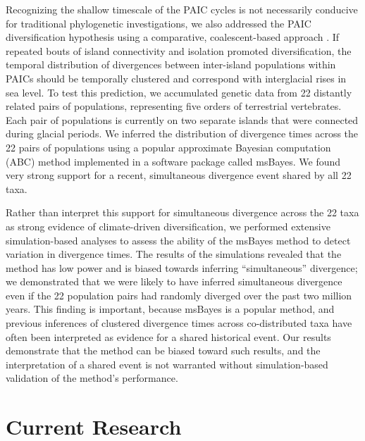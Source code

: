 \documentclass[10pt]{article}
\begin{document}
Recognizing the shallow timescale of the PAIC cycles is not necessarily
conducive for traditional phylogenetic investigations, we also addressed the
PAIC diversification hypothesis using a comparative, coalescent-based approach
.
If repeated bouts of island connectivity and isolation promoted
diversification, the temporal distribution of divergences between inter-island
populations within PAICs should be temporally clustered and correspond with
interglacial rises in sea level.
To test this prediction, we accumulated genetic data from 22 distantly related
pairs of populations, representing five orders of terrestrial vertebrates.
Each pair of populations is currently on two separate islands that were
connected during glacial periods.
We inferred the distribution of divergence times across the 22 pairs of
populations using a popular approximate Bayesian computation (ABC) method
implemented in a software package called msBayes.
We found very strong support
for a recent, simultaneous divergence event shared by all 22 taxa.

Rather than interpret this support for simultaneous divergence across the 22
taxa as strong evidence of climate-driven diversification, we performed
extensive simulation-based analyses to assess the ability of the msBayes method
to detect variation in divergence times.
The results of the simulations revealed that the method has low power and is
biased towards inferring ``simultaneous'' divergence; we demonstrated that we
were likely to have inferred simultaneous divergence even if the 22 population
pairs had randomly diverged over the past two million years.
This finding is important, because msBayes is a popular method, and previous
inferences of clustered divergence times across co-distributed taxa have often
been interpreted as evidence for a shared historical event.
Our results demonstrate that the method can be biased toward such results, and
the interpretation of a shared event is not warranted without simulation-based
validation of the method's performance.


\section*{Current Research}

\end{document}
